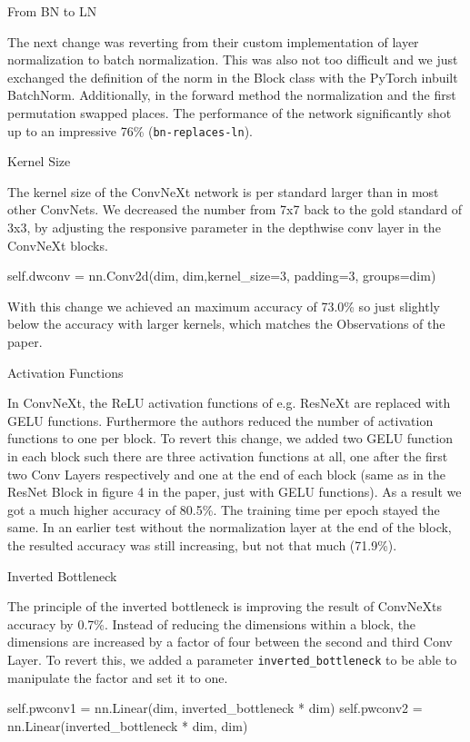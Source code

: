 \documentclass{article}
\begin{document}
From BN to LN

The next change was reverting from their custom implementation of layer normalization to batch normalization.
This was also not too difficult and we just exchanged the definition of the norm in the Block class with the PyTorch inbuilt BatchNorm.
Additionally, in the forward method the normalization and the first permutation swapped places.
The performance of the network significantly shot up to an impressive 76\% (\texttt{bn-replaces-ln}).

Kernel Size

The kernel size of the ConvNeXt network is per standard larger than in most other ConvNets.
We decreased the number from 7x7 back to the gold standard of 3x3, by adjusting the responsive parameter in the depthwise conv layer in the ConvNeXt blocks.
\begin{python}
    self.dwconv = nn.Conv2d(dim, dim,kernel_size=3, padding=3, groups=dim)
\end{python}

With this change we achieved an maximum accuracy of 73.0\% so just slightly below the accuracy with larger kernels, which matches the Observations of the paper.


Activation Functions

In ConvNeXt, the ReLU activation functions of e.g. ResNeXt are replaced with GELU functions.
Furthermore the authors reduced the number of activation functions to one per block.
To revert this change, we added two GELU function in each block such there are three activation functions at all, one after the first two Conv Layers respectively and one at the end of each block (same as in the ResNet Block in figure 4 in the paper, just with GELU functions).
As a result we got a much higher accuracy of 80.5\%.
The training time per epoch stayed the same.
In an earlier test without the normalization layer at the end of the block, the resulted accuracy was still increasing, but not that much (71.9\%).

Inverted Bottleneck

The principle of the inverted bottleneck is improving the result of ConvNeXts accuracy by 0.7\%.
Instead of reducing the dimensions within a block, the dimensions are increased by a factor of four between the second and third Conv Layer.
To revert this, we added a parameter \texttt{inverted\_bottleneck}
to be able to manipulate the factor and set it to one.

\begin{python}
    self.pwconv1 = nn.Linear(dim, inverted_bottleneck * dim)
    self.pwconv2 = nn.Linear(inverted_bottleneck * dim, dim)
\end{python}
\end{document}
